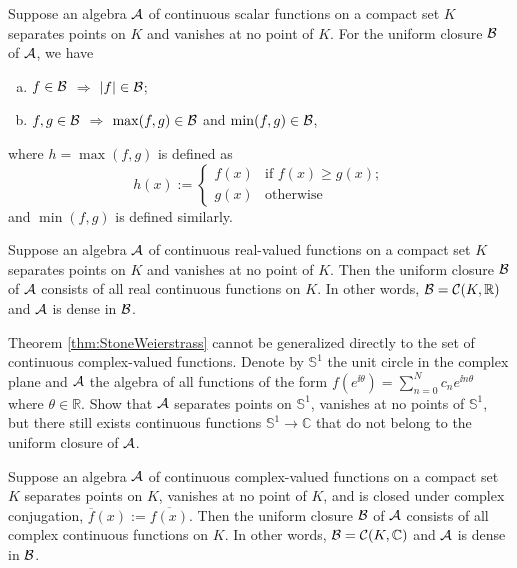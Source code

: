 \begin{lem}
  \label{lem:absMaxMinInFuncClosure}
  Suppose an algebra ${\cal A}$ of continuous scalar functions
  on a compact set $K$
  separates points on $K$ and vanishes at no point of $K$.
  For the uniform closure ${\cal B}$ of ${\cal A}$, 
  we have
  \begin{enumerate}[(a)]\itemsep0em
  \item $f\in{\cal B}$ $\Rightarrow$ $|f|\in {\cal B}$;
  \item $f,g\in{\cal B}$ $\Rightarrow$
    $\max(f,g)\in {\cal B}$ and $\min(f,g)\in {\cal B}$, 
  \end{enumerate}
  where $h=\max(f,g)$ is defined as
  \begin{equation}
    \label{eq:maxFG}
    h(x):=
    \begin{cases}
      f(x) & \text{if } f(x)\ge g(x);
      \\
      g(x) & \text{otherwise }
    \end{cases}
  \end{equation}
  and $\min(f,g)$ is defined similarly.
\end{lem}

\begin{thm}
  \label{thm:StoneWeierstrass}
  Suppose an algebra ${\cal A}$ of continuous real-valued functions
  on a compact set $K$
  separates points on $K$ and vanishes at no point of $K$.
  Then the uniform closure ${\cal B}$ of ${\cal A}$
  consists of all real continuous functions on $K$. 
  In other words, ${\cal B}={\cal C}(K, \mathbb{R})$
  and ${\cal A}$ is dense in ${\cal B}$.
\end{thm}

\begin{exc}
  Theorem \ref{thm:StoneWeierstrass}
  cannot be generalized directly to
  the set of continuous complex-valued functions.
  Denote by $\mathbb{S}^1$ the unit circle in the complex plane
  and ${\cal A}$ the algebra of all functions of the form
  $f(e^{\ii \theta}) = \sum_{n=0}^N c_n e^{\ii n\theta}$
  where $\theta\in \mathbb{R}$.
  Show that ${\cal A}$ separates points on $\mathbb{S}^1$,
  vanishes at no points of $\mathbb{S}^1$,
  but there still exists continuous functions
  $\mathbb{S}^1\rightarrow \mathbb{C}$
  that do not belong to the uniform closure of ${\cal A}$. 
\end{exc}

\begin{coro}
  \label{coro:StoneWeierstrass}
  Suppose an algebra ${\cal A}$ of continuous complex-valued functions
  on a compact set $K$
  separates points on $K$, vanishes at no point of $K$, 
  and is closed under complex conjugation, %
  $\overline{f}(x):=\overline{f(x)}$. 
  Then the uniform closure ${\cal B}$ of ${\cal A}$
  consists of all complex continuous functions on $K$.
  In other words,
  ${\cal B}={\cal C}(K, \mathbb{C})$
  and ${\cal A}$ is dense in ${\cal B}$.
\end{coro}

